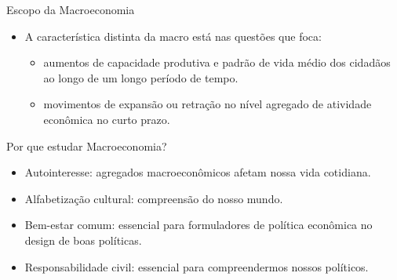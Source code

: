 \documentclass[10pt]{beamer}
\begin{document}
\begin{frame}{Escopo da Macroeconomia}
    \begin{itemize}
        \item A característica distinta da macro está nas questões que foca: \bigskip
        \begin{itemize}
            \item {} aumentos de capacidade produtiva e padrão de vida médio dos cidadãos ao longo de um longo período de tempo. \bigskip
            \item {} movimentos de expansão ou retração no nível agregado de atividade econômica no curto prazo.            
        \end{itemize}
    \end{itemize}
\end{frame}

\begin{frame}{Por que estudar Macroeconomia?}
    \begin{itemize}
        \item Autointeresse: agregados macroeconômicos afetam nossa vida cotidiana. \bigskip
        \item Alfabetização cultural: compreensão do nosso mundo. \bigskip
        \item Bem-estar comum: essencial para formuladores de política econômica no design de boas políticas. \bigskip
        \item Responsabilidade civil: essencial para compreendermos nossos políticos.
    \end{itemize}
\end{frame}
\end{document}

